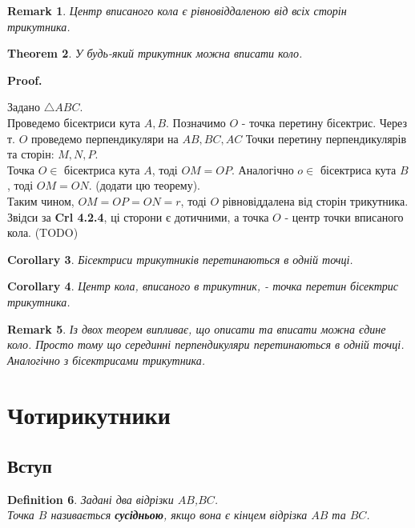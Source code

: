 \documentclass[a4paper, 10pt]{article}
\makeatletter
\def\qed{$\blacksquare$}
\theoremstyle{theoremdd}
\newtheorem{theorem}{Theorem}[subsection]
\theoremstyle{theoremdd}
\theoremstyle{theoremdd}
\newtheorem{definition}[theorem]{Definition}
\theoremstyle{theoremdd}
\theoremstyle{theoremdd}
\theoremstyle{theoremdd}
\theoremstyle{theoremdd}
\newtheorem{remark}[theorem]{Remark}
\theoremstyle{theoremdd}
\theoremstyle{theoremdd}
\newtheorem{corollary}[theorem]{Corollary}
\renewenvironment{proof}[1][Proof.\\]{\par
\pushQED{\hfill \qed}%
\normalfont \topsep6\p@\@plus6\p@\relax
\trivlist
\item\relax
{\bfseries
#1\@addpunct{.}}\hspace\labelsep\ignorespaces
}{%
\popQED\endtrivlist\@endpefalse
}
\makeatother
\begin{document}
\begin{remark}
Центр вписаного кола є рівновіддаленою від всіх сторін трикутника.
\end{remark}

\begin{theorem}
У будь-який трикутник можна вписати коло.
\end{theorem}

\begin{proof}
Задано $\triangle ABC$.\\
Проведемо бісектриси кута $A,B$. Позначимо $O$ - точка перетину бісектрис. Через т. $O$ проведемо перпендикуляри на $AB,BC,AC$ Точки перетину перпендикулярів та сторін: $M,N,P$.\\
Точка $O \in$ бісектриса кута $A$, тоді $OM = OP$. Аналогічно $o \in$ бісектриса кута $B$, тоді $OM = ON$. (додати цю теорему).\\
Таким чином, $OM = OP = ON = r$, тоді $O$ рівновіддалена від сторін трикутника. Звідси за \textbf{Crl 4.2.4}, ці сторони є дотичними, а точка $O$ - центр точки вписаного кола.
(TODO)
\end{proof}

\begin{corollary}
Бісектриси трикутників перетинаються в одній точці.
\end{corollary}

\begin{corollary}
Центр кола, вписаного в трикутник, - точка перетин бісектрис трикутника.
\end{corollary}

\begin{remark}
Із двох теорем випливає, що описати та вписати можна єдине коло. Просто тому що серединні перпендикуляри перетинаються в одній точці. Аналогічно з бісектрисами трикутника.
\end{remark}

\newpage

\section{Чотирикутники}
\subsection{Вступ}
\begin{definition}
Задані два відрізки $AB$,$BC$.\\
Точка $B$ називається \textbf{сусідньою}, якщо вона є кінцем відрізка $AB$ та $BC$.
\begin{figure}[H]
\centering
{}
\end{figure}
\end{definition}
\end{document}
